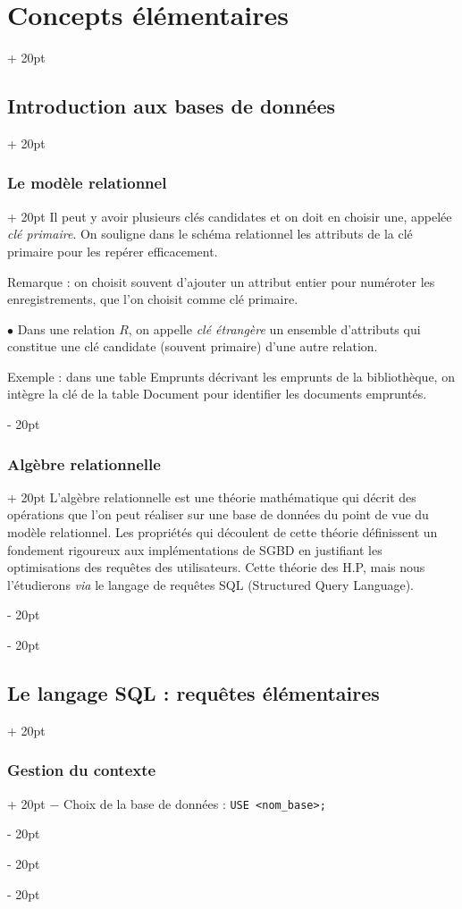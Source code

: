 \documentclass[a4paper, 12pt, twoside]{article}
\newcommand{\ind}[1][20pt]{\advance\leftskip + #1}
\newcommand{\deind}[1][20pt]{\advance\leftskip - #1}
\newenvironment{indt}[2][20pt]{#2 \par \ind[#1]}{\par \deind} %
\begin{document}
\begin{indt}{\section{Concepts élémentaires}}
\begin{indt}{\subsection{Introduction aux bases de données}}
\begin{indt}{\subsubsection{Le modèle relationnel}}
                Il peut y avoir plusieurs clés candidates et on doit en choisir une, appelée \textit{clé primaire}. On souligne dans le schéma relationnel les attributs de la clé primaire pour les repérer efficacement.
                
                Remarque : on choisit souvent d'ajouter un attribut entier pour numéroter les enregistrements, que l'on choisit comme clé primaire.
                
                \vspace{12pt}
                
                $\bullet$ Dans une relation $R$, on appelle \textit{clé étrangère} un ensemble d'attributs qui constitue une clé candidate (souvent primaire) d'une autre relation.
                
                \vspace{6pt}
                
                Exemple : dans une table Emprunts décrivant les emprunts de la bibliothèque, on intègre la clé de la table Document pour identifier les documents empruntés.
            \end{indt}
            
            \vspace{12pt}
            
            \begin{indt}{\subsubsection{Algèbre relationnelle}}
                L'algèbre relationnelle est une théorie mathématique qui décrit des opérations que l'on peut réaliser sur une base de données du point de vue du modèle relationnel. Les propriétés qui découlent de cette théorie définissent un fondement rigoureux aux implémentations de SGBD en justifiant les optimisations des requêtes des utilisateurs. Cette théorie des H.P, mais nous l'étudierons \textit{via} le langage de requêtes SQL (Structured Query Language).
            \end{indt}
        \end{indt}
        
        \begin{indt}{\subsection{Le langage SQL : requêtes élémentaires}}
            \begin{indt}{\subsubsection{Gestion du contexte}}
                $-$ Choix de la base de données : \texttt{USE <nom\_base>;}
                

\end{indt}
\end{indt}
\end{indt}
\end{document}
